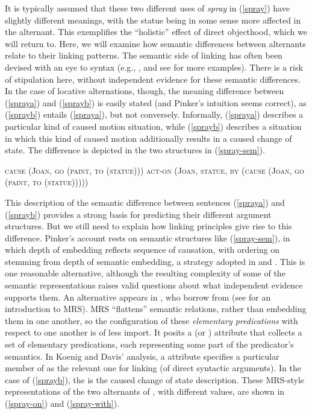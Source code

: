 \documentclass[output=paper
                ,modfonts
                ,nonflat
	        ,collection
	        ,collectionchapter
	        ,collectiontoclongg
 	        ,biblatex
                ,babelshorthands
                ,newtxmath
                ,draftmode
                ,colorlinks, citecolor=brown
]{./langsci/langscibook}
\begin{document}
It is typically assumed that these two different uses of \textit{spray} in (\ref{spray}) have slightly different meanings, with the statue being in some sense more affected in the  alternant.
This exemplifies the ``holistic'' effect of direct objecthood,  which we will return to.
Here, we will examine how semantic differences between alternants relate to their linking patterns.
The semantic side of linking has often been devised with an eye to syntax (e.g., \citealt{Pinker1989}, and see \citealt{KoenigandDavis2006} for more examples).
There is a risk of stipulation here, without independent evidence for these semantic differences.
In the case of locative alternations, though, the meaning difference between (\ref{spraya}) and (\ref{sprayb}) is easily stated (and Pinker's intuition seems correct), as (\ref{sprayb}) entails (\ref{spraya}), but not conversely.
Informally, (\ref{spraya}) describes a particular kind of caused motion situation, while  (\ref{sprayb}) describes a situation in which this kind of caused motion additionally results in a caused change of state.
The difference is depicted in the two structures in (\ref{spray-sem}).

\begin{exe}\ex\label{spray-sem}
\begin{xlist}
\ex \label{spray-sema} \textsc{cause (Joan, go (paint, to (statue)))}
\ex \label{spray-semb} \textsc{act-on (Joan, statue, by (cause (Joan, go (paint, to (statue)))))}
\end{xlist}
\end{exe}

This description of the semantic difference between sentences (\ref{spraya}) and (\ref{sprayb}) provides a strong basis for predicting their different argument structures.
But we still need to explain how linking principles give rise to this difference.
Pinker's account rests on semantic structures like (\ref{spray-sem}), in which depth of embedding reflects sequence of causation, with ordering on \argst stemming from depth of semantic embedding, a strategy adopted in \citet{Davis1996} and \citet{Davis2001}.
This is one reasonable alternative, although the resulting complexity of some of the semantic representations raises valid questions about what independent evidence supports them.
An alternative appears in \citet{KoenigandDavis2006}, who borrow from  (see  for an introduction to MRS).
MRS ``flattens'' semantic relations, rather than embedding them in one another, so the configuration of these \emph{elementary predications}  with respect to one another is of less import.
It posits a  (or \rels)  attribute that collects a set of elementary predications, each representing some part of the predicator's semantics.
In Koenig and Davis' analysis, a  attribute specifies a particular member of \rels as the relevant one for linking (of direct syntactic arguments). 
In the case of (\ref{sprayb}), the  is the caused change of state description.
These MRS-style representations of the two alternants of , with different  values, are shown in (\ref{spray-on}) and (\ref{spray-with}).
\end{document}
